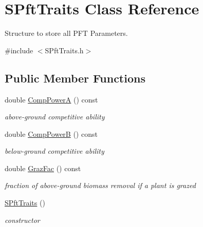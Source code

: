 \hypertarget{class_s_pft_traits}{}\section{S\+Pft\+Traits Class Reference}
\label{class_s_pft_traits}


Structure to store all P\+FT Parameters.  




{\ttfamily \#include $<$S\+Pft\+Traits.\+h$>$}

\subsection*{Public Member Functions}
\begin{DoxyCompactItemize}
\item 
\mbox{\label{class_s_pft_traits_ae44be63aad86c06fb232ee93ebb1455a}} 
double \mbox{\hyperlink{class_s_pft_traits_ae44be63aad86c06fb232ee93ebb1455a}{Comp\+PowerA}} () const
\begin{DoxyCompactList}\small\item\em above-\/ground competitive ability \end{DoxyCompactList}\item 
\mbox{\label{class_s_pft_traits_ae3ed4a674e7d004a4bdace378c4df6ff}} 
double \mbox{\hyperlink{class_s_pft_traits_ae3ed4a674e7d004a4bdace378c4df6ff}{Comp\+PowerB}} () const
\begin{DoxyCompactList}\small\item\em below-\/ground competitive ability \end{DoxyCompactList}\item 
\mbox{\label{class_s_pft_traits_a66b412aa004c42502be7a73f0b5f3782}} 
double \mbox{\hyperlink{class_s_pft_traits_a66b412aa004c42502be7a73f0b5f3782}{Graz\+Fac}} () const
\begin{DoxyCompactList}\small\item\em fraction of above-\/ground biomass removal if a plant is grazed \end{DoxyCompactList}\item 
\mbox{\hyperlink{class_s_pft_traits_a832b7b9af357d2e0638352ff4960f1d9}{S\+Pft\+Traits}} ()
\begin{DoxyCompactList}\small\item\em constructor \end{DoxyCompactList}\item 

\end{DoxyCompactItemize}
